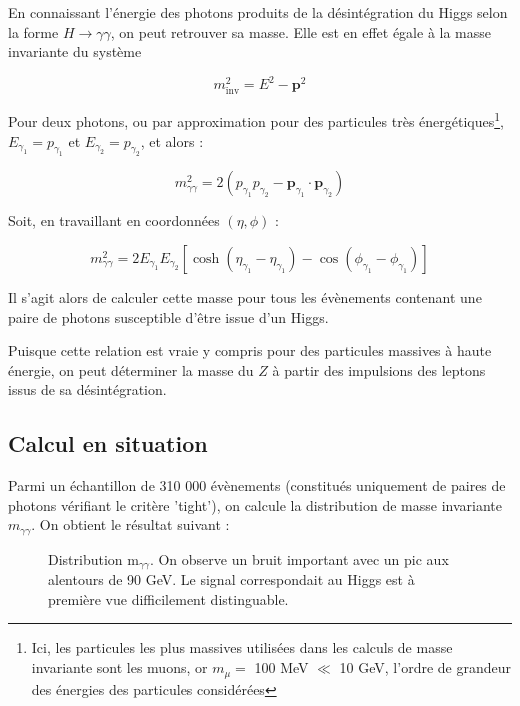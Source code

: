 \documentclass[11pt]{article} %
\begin{document}
En connaissant l'énergie des photons produits de la désintégration du Higgs selon la forme $H\to \gamma \gamma$, on peut retrouver sa masse. Elle est en effet égale à la masse invariante du système 

\begin{equation}
m_{\textrm{inv}}^2 = E^2 - \textbf{p}^2
\end{equation}

Pour deux photons,  ou par approximation pour des particules très énergétiques\footnote{Ici, les particules les plus massives utilisées dans les calculs de masse invariante sont les muons, or $m_\mu = $ 100 MeV $\ll $ 10 GeV, l'ordre de grandeur des énergies des particules considérées}, $E_{\gamma_1} = p_{\gamma_1}$ et $E_{\gamma_2} = p_{\gamma_2}$, et alors :

\begin{equation}
m_{\gamma \gamma}^2 = 2 \left ( p_{\gamma_1} p_{\gamma_2} - \textbf{p}_{\gamma_1} \cdot \textbf{p}_{\gamma_2} \right )
\end{equation}

Soit, en travaillant en coordonnées $(\eta, \phi)$ :

\begin{equation}
m_{\gamma \gamma}^2 = 2 E_{\gamma_1} E_{\gamma_2} \left [ \cosh {\left( \eta_{\gamma_1} - \eta_{\gamma_1} \right)} - \cos{\left( \phi_{\gamma_1} - \phi_{\gamma_1} \right)} \right ]
\end{equation}

Il s'agit alors de calculer cette masse pour tous les évènements contenant une paire de photons susceptible d'être issue d'un Higgs. 

Puisque cette relation est vraie y compris pour des particules massives à haute énergie, on peut déterminer la masse du $Z$ à partir des impulsions des leptons issus de sa désintégration.

\subsection{Calcul en situation}

Parmi un échantillon de 310 000 évènements (constitués uniquement de paires de photons vérifiant le critère 'tight'), on calcule la distribution de masse invariante $m_{\gamma \gamma}$. On obtient le résultat suivant :

\begin{figure}[H]
\centering
  \caption{Distribution m$_{\gamma \gamma}$. On observe un bruit important avec un pic aux alentours de 90 GeV. Le signal correspondait au Higgs est à première vue difficilement distinguable. }
 \resizebox{.9\linewidth}{!}{}
\end{figure}
\end{document}

